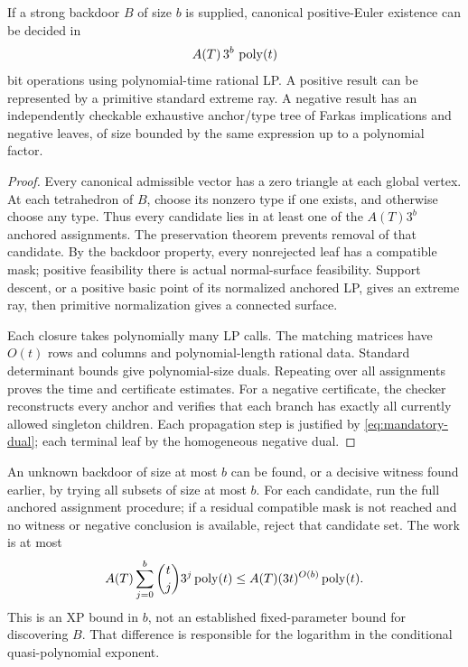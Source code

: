 \begin{theorem}\label{thm:backdoor}
If a strong backdoor $B$ of size $b$ is supplied, canonical positive-Euler existence can be decided in
\begin{equation}\label{eq:backdoor-cost}
 A(T)\,3^b\,\operatorname{poly}(t)
\end{equation}
bit operations using polynomial-time rational LP. A positive result can be represented by a primitive standard extreme ray. A negative result has an independently checkable exhaustive anchor/type tree of Farkas implications and negative leaves, of size bounded by the same expression up to a polynomial factor.
\end{theorem}
\begin{proof}
Every canonical admissible vector has a zero triangle at each global vertex. At each tetrahedron of $B$, choose its nonzero type if one exists, and otherwise choose any type. Thus every candidate lies in at least one of the $A(T)3^b$ anchored assignments. The preservation theorem prevents removal of that candidate. By the backdoor property, every nonrejected leaf has a compatible mask; positive feasibility there is actual normal-surface feasibility. Support descent, or a positive basic point of its normalized anchored LP, gives an extreme ray, then primitive normalization gives a connected surface.

Each closure takes polynomially many LP calls. The matching matrices have $O(t)$ rows and columns and polynomial-length rational data. Standard determinant bounds give polynomial-size duals. Repeating over all assignments proves the time and certificate estimates. For a negative certificate, the checker reconstructs every anchor and verifies that each branch has exactly all currently allowed singleton children. Each propagation step is justified by \eqref{eq:mandatory-dual}; each terminal leaf by the homogeneous negative dual.
\end{proof}

An unknown backdoor of size at most $b$ can be found, or a decisive witness found earlier, by trying all subsets of size at most $b$. For each candidate, run the full anchored assignment procedure; if a residual compatible mask is not reached and no witness or negative conclusion is available, reject that candidate set. The work is at most
\begin{equation}\label{eq:unknown-backdoor}
 A(T)\sum_{j=0}^{b}\binom tj3^j\operatorname{poly}(t)
 \le A(T)(3t)^{O(b)}\operatorname{poly}(t).
\end{equation}
This is an XP bound in $b$, not an established fixed-parameter bound for discovering $B$. That difference is responsible for the logarithm in the conditional quasi-polynomial exponent.

